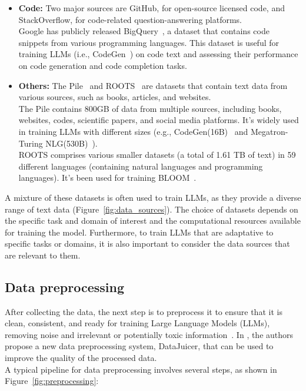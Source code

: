 \begin{itemize}
{		      Typically, the English-only filtered versions of Wikipedia are widely used in most LLMs (e.g., GPT-3~\cite{brown2020language}, and LLaMA~\cite{touvron2023llama}).
		      Wikipedia is available in multiple languages and can be used in multilingual settings.
	      }
	\item \textbf{Code:} {
		      Two major sources are GitHub, for open-source licensed code, and StackOverflow, for code-related question-answering platforms.\\
		      Google has publicly released BigQuery~\cite{bigquerydataset}, a dataset that contains code snippets from various programming languages. This dataset is useful for training LLMs (i.e., CodeGen~\cite{nijkamp2022codegen}) on code text and assessing their performance on code generation and code completion tasks.
	      }
	\item \textbf{Others:} {
		      The Pile~\cite{gao2021pile} and ROOTS~\cite{laurencon2022bigscience} are datasets that contain text data from various sources, such as books, articles, and websites.\\
		      The Pile contains 800GB of data from multiple sources, including books, websites, codes, scientific papers, and social media platforms. It's widely used in training LLMs with different sizes (e.g., CodeGen(16B)~\cite{nijkamp2022codegen} and Megatron-Turing NLG(530B)~\cite{smith2022deepspeed}).\\
		      ROOTS comprises various smaller datasets (a total of 1.61 TB of text) in 59 different languages (containing natural languages and programming languages). It's been used for training BLOOM~\cite{workshop2023bloom}.
	      }
\end{itemize}

A mixture of these datasets is often used to train LLMs, as they provide a diverse range of text data (Figure~\ref{fig:data_sources}).
The choice of datasets depends on the specific task and domain of interest and the computational resources available for training the model.
Furthermore, to train LLMs that are adaptative to specific tasks or domains, it is also important to consider the data sources that are relevant to them.\\

\subsection{Data preprocessing}
\label{subsec:data-preprocessing}

After collecting the data, the next step is to preprocess it to ensure that it is clean, consistent, and ready for training Large Language Models (LLMs), removing noise and irrelevant or potentially toxic information~\cite{chowdhery2022palm, rae2021scaling, longpre2023pretrainer}.
In \textcite{chen2023datajuicer}, the authors propose a new data preprocessing system, DataJuicer, that can be used to improve the quality of the processed data.\\
A typical pipeline for data preprocessing involves several steps, as shown in Figure~\ref{fig:preprocessing}:

